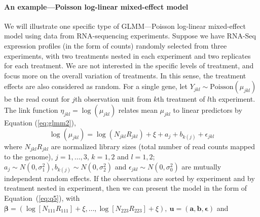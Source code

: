 \paragraph{An example---Poisson log-linear mixed-effect model}\label{poisson} 
We will illustrate one specific type of GLMM---Poisson log-linear mixed-effect model using data
from RNA-sequencing experiments. Suppose we have RNA-Seq expression profiles (in the form of counts)
randomly selected from three experiments, with two treatments nested in each experiment and two
replicates for each treatment. We are not interested in the specific levels of treatment, and focus
more on the overall variation of treatments. In this sense, the treatment effects are also
considered as random. For a single gene, let $Y_{jkl}\sim \text{Poisson}(\mu_{jkl})$ be the read
count for $j$th observation unit from $k$th treatment of $l$th experiment. The link function
$\eta_{jkl} = \log (\mu_{jkl})$ relates mean $\mu_{jkl}$ to linear predictors by Equation
(\ref{eq:glmm2}),  
\begin{equation}\label{eq:example}
	\log (\mu_{jkl}) = \log (N_{jkl}R_{jkl}) + \xi + a_{j} + b_{k(j)} + \epsilon_{jkl}
\end{equation}
where $N_{jkl}R_{jkl}$ are normalized library sizes (total number of read counts mapped to the
genome),  $j=1, \ldots,  3$, $k=1, 2$ and $l=1, 2$; $a_j \sim N(0, \sigma_1^2), b_{k(j)}\sim N(0,
\sigma_2^2)$ and $\epsilon_{jkl}\sim N(0, \sigma_0^2)$ are mutually independent random effects. If
the observations are sorted by experiment and by treatment nested in experiment, then we can present
the model in the form of Equation~(\ref{eq:q5}), with  $\bm \beta = (\log [N_{111}R_{111}]  +
\xi,\ldots, \log [N_{223}R_{223}]  + \xi), ~\bm u = (\bm a, \bm b, \bm \epsilon)$ and 
